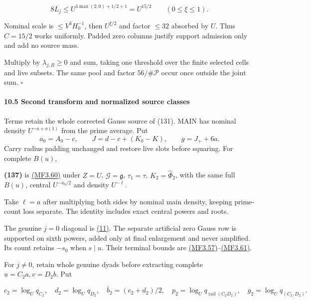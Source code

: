 \[
8L_j\le U^{3\max(2,0)+1/2+1}=U^{15/2}\qquad(0\le\xi\le1).
\]

Nominal scale is \(\le V^3H_0^{-1}\), then \(U^{\xi/2}\) and factor \(\le32\) absorbed by \(U\). Thus \(C=15/2\) works uniformly. Padded zero columns justify support admission only and add no source mass.

Multiply by \(\lambda_{j,B}\ge0\) and sum, taking one threshold over the finite selected cells and live subsets. The same pool and factor \(56/\#\mathcal P\) occur once outside the joint sum. \(\square\)

\hypertarget{sr:second}{}

\label{sr:second}

\hypertarget{second-transform-and-normalized-source-classes}{%
\paragraph{10.5 Second transform and normalized source classes}\label{second-transform-and-normalized-source-classes}}

Terms retain the whole corrected Gauss source of (131). MAIN has
nominal density \(U^{-a+o(1)}\) from the prime average. Put
\[
 a_0=A_0-c,\qquad J=d-c+(K_0-K),\qquad g=J_++6a.
\]
Carry radius padding unchanged and restore live slots before squaring.
For complete \(B(u)\),

\hypertarget{sr:second-poisson}{}

\label{sr:second-poisson}

\textbf{(137)} is \protect\hyperlink{mf:eq:B3.60}{(MF3.60)} under \(Z=U\), \(\mathcal G=\mathfrak g\), \(\tau_1=\tau\), \(K_2=\widehat\Phi_2\), with the same full \(B(u)\), central \(U^{-a_0/2}\) and density \(U^{-\ell}\).

Take \(\ell=a\) after multiplying both sides by nominal main density, keeping prime-count loss separate. The identity includes exact central powers and roots.

The genuine \(j=0\) diagonal is \protect\hyperlink{cf:eq:A.15}{(11)}. The separate artificial zero Gauss row is supported on sixth powers, added only at final enlargement and never amplified. Its count retains \(-s_0\) when \(s\mid u\). Their terminal bounds are \protect\hyperlink{mf:eq:B3.57}{(MF3.57)}--\protect\hyperlink{mf:eq:B3.61}{(MF3.61)}.

For \(j\ne0\), retain whole genuine dyads before extracting complete \(u=C_2a,v=D_2b\). Put

\[
c_2=\log_Uq_{C_2},\quad d_2=\log_Uq_{D_2},\quad \bar b_2=(c_2+d_2)/2,
 \quad p_2=\log_Uq_{\operatorname{rad}(C_2D_2)},\quad
 g_2=\log_Uq_{(C_2,D_2)}.
\]

